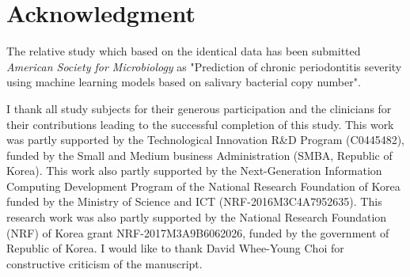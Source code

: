 \documentclass[11pt, a4paper]{article}
\begin{document}
    \section{Acknowledgment}
    	The relative study which based on the identical data has been submitted \textit{American Society for Microbiology} as "Prediction of chronic periodontitis severity using machine learning models based on salivary bacterial copy number". 
    	
    	I thank all study subjects for their generous participation and the clinicians for their contributions leading to the successful completion of this study. This work was partly supported by the Technological Innovation R\&D Program (C0445482), funded by the Small and Medium business Administration (SMBA, Republic of Korea). This work also partly supported by the Next-Generation Information Computing Development Program of the National Research Foundation of Korea funded by the Ministry of Science and ICT (NRF-2016M3C4A7952635). This research work was also partly supported by the National Research Foundation (NRF) of Korea grant NRF-2017M3A9B6062026, funded by the government of Republic of Korea. I would like to thank David Whee-Young Choi for constructive criticism of the manuscript. 
    
    
    
\end{document}
